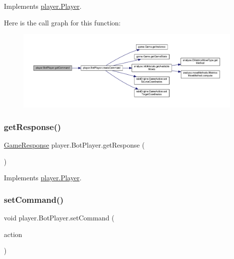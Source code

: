 Implements \mbox{\hyperlink{interfaceplayer_1_1_player_a5ee58794f4ad8b342a3f1fcb87623c6d}{player.\+Player}}.

Here is the call graph for this function\+:
\nopagebreak
\begin{figure}[H]
\begin{center}
\leavevmode
\includegraphics[width=350pt]{classplayer_1_1_bot_player_a811ae631a057c586488b32badd752f3c_cgraph}
\end{center}
\end{figure}
\mbox{\label{classplayer_1_1_bot_player_a2903d1ac9d7871117d08951346b0d190}} 
\subsubsection{\texorpdfstring{get\+Response()}{getResponse()}}
{\footnotesize\ttfamily \mbox{\hyperlink{classui_1_1_game_response}{Game\+Response}} player.\+Bot\+Player.\+get\+Response (\begin{DoxyParamCaption}{ }\end{DoxyParamCaption})\hspace{0.3cm}{\ttfamily [inline]}}



Implements \mbox{\hyperlink{interfaceplayer_1_1_player_a1e537587aa2b804f6f27f7fd8af18a53}{player.\+Player}}.

\mbox{\label{classplayer_1_1_bot_player_a716f0bd1509ca717defac662e8a3bb27}} 
\subsubsection{\texorpdfstring{set\+Command()}{setCommand()}}
{\footnotesize\ttfamily void player.\+Bot\+Player.\+set\+Command (\begin{DoxyParamCaption}\item[{\mbox{\hyperlink{classui_1_1_u_i_action}{U\+I\+Action}}}]{action }\end{DoxyParamCaption})\hspace{0.3cm}{\ttfamily [inline]}}



